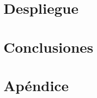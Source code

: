 \documentclass[openright,twoside,10pt]{book}
\begin{document}
\chapter{Despliegue}\label{cap.despliegue}


%


\chapter{Conclusiones}\label{cap.conclusiones}



\chapter{Apéndice}\label{cap:apendice}






\cleardoublepage
{}

 


\end{document}
